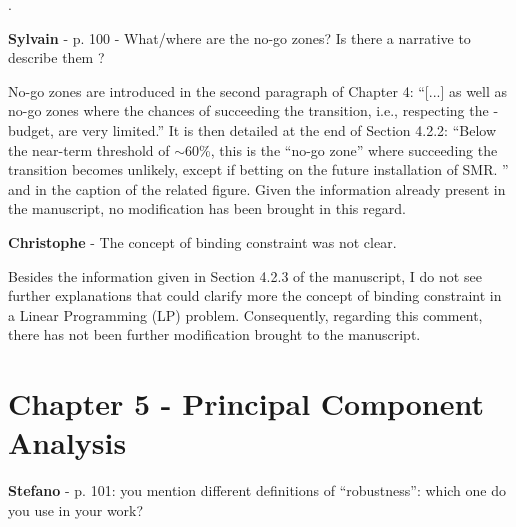 \documentclass[12pt,a4paper]{article}
\begin{document}
\noindent {\color{blue} }. 

\begin{mdframed}[style=manuscript] %

\end{mdframed}

\begin{mdframed}[style=comment] %
{\color{purple} \textbf{Sylvain}} - p. 100 - What/where are the no-go zones? Is there a narrative to describe them ?
\end{mdframed}

\noindent No-go zones are introduced in the second paragraph of Chapter 4: ``[...] as well as no-go zones where the chances of succeeding the transition, i.e., respecting the -budget, are very limited.'' It is then detailed at the end of Section 4.2.2: ``Below the near-term threshold of $\sim$60\%, this is the ``no-go zone'' where succeeding the transition becomes unlikely, except
if betting on the future installation of SMR. '' and in the caption of the related figure. Given the information already present in the manuscript, no modification has been brought in this regard.

\begin{mdframed}[style=comment] %
{\color{violet} \textbf{Christophe}} - The concept of binding constraint was not clear.
\end{mdframed}

\noindent
Besides the information given in Section 4.2.3 of the manuscript, I do not see further explanations that could clarify more the concept of binding constraint in a Linear Programming (LP) problem. Consequently, regarding this comment, there has not been further modification brought to the manuscript.

\section{Chapter 5 - Principal Component Analysis}
\label{PCA}

\begin{mdframed}[style=comment] %
{\color{orange} \textbf{Stefano}} - p. 101: you mention different definitions of “robustness”: which one do you use in your work?
\end{mdframed}

\noindent 

\begin{mdframed}[style=manuscript] %

\end{mdframed}
\end{document}
